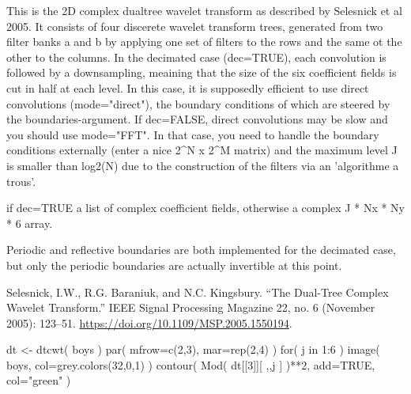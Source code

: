 \documentclass[a4paper]{book}
\begin{document}
%
\begin{Details}\relax
This is the 2D complex dualtree wavelet transform as described by Selesnick et al 2005. It consists of four discerete wavelet transform trees, generated from two filter banks a and b by applying one set of filters to the rows and the same ot the other to the columns. 
In the decimated case (dec=TRUE), each convolution is followed by a downsampling, meaining that the size of the six coefficient fields is cut in half at each level. In this case, it is supposedly efficient to use direct convolutions (mode="direct"), the boundary conditions of which are steered by the boundaries-argument. If dec=FALSE, direct convolutions may be slow and you should use mode="FFT". In that case, you need to handle the boundary conditions externally  (enter a nice 2\textasciicircum{}N x 2\textasciicircum{}M matrix) and the maximum level J is smaller than log2(N) due to the construction of the filters via an 'algorithme a trous'.
\end{Details}
%
\begin{Value}
if dec=TRUE a list of complex coefficient fields, otherwise a complex J * Nx * Ny * 6 array.
\end{Value}
%
\begin{Note}\relax
Periodic and reflective boundaries are both implemented for the decimated case, but only the periodic boundaries are actually invertible at this point.
\end{Note}
%
\begin{References}\relax
Selesnick, I.W., R.G. Baraniuk, and N.C. Kingsbury. “The Dual-Tree Complex Wavelet Transform.” IEEE Signal Processing Magazine 22, no. 6 (November 2005): 123–51. \url{https://doi.org/10.1109/MSP.2005.1550194}.
\end{References}
%
\begin{SeeAlso}\relax
{}
\end{SeeAlso}
%
\begin{Examples}
\begin{ExampleCode}
dt <- dtcwt( boys )
par( mfrow=c(2,3), mar=rep(2,4) )
for( j in 1:6 ){
    image( boys, col=grey.colors(32,0,1) )
    contour( Mod( dt[[3]][ ,,j ] )**2, add=TRUE, col="green" )
} 
\end{ExampleCode}
\end{Examples}
\end{document}
